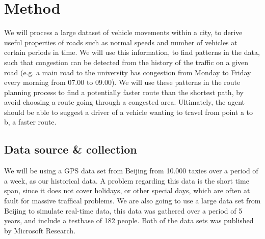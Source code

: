 \section{Method}
We will process a large dataset of vehicle movements within a city, to derive useful properties of roads such as normal speeds and number of vehicles at certain periods in time. We will use this information, to find patterns in the data, such that congestion can be detected from the history of the traffic on a given road (e.g. a main road to the university has congestion from Monday to Friday every morning from 07.00 to 09.00). We will use these patterns in the route planning process to find a potentially faster route than the shortest path, by avoid choosing a route going through a congested area. Ultimately, the agent should be able to suggest a driver of a vehicle wanting to travel from point a to b, a faster route.

\subsection*{Data source \& collection}
We will be using a GPS data set from Beijing from 10.000 taxies over a period of a week, as our historical data\cite{Tdrive}. A problem regarding this data is the short time span, since it does not cover holidays, or other special days, which are often at fault for massive traffical problems. We are also going to use a large data set from Beijing to simulate real-time data, this data was gathered over a period of 5 years, and include a testbase of 182 people\cite{Geolife}. Both of the data sets was published by Microsoft Research.

